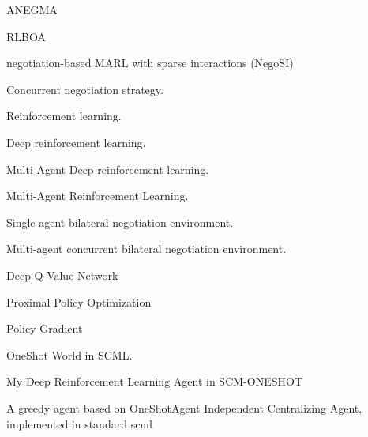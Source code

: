 %
{%
ANEGMA
}

%
{%
RLBOA
}

%
{%
negotiation-based MARL with sparse interactions (NegoSI)
}

%
{%
Concurrent negotiation strategy.
}

%
{%
Reinforcement learning.
}

%
{%
Deep reinforcement learning.
}

%
{%
Multi-Agent Deep reinforcement learning.
}

%
{%
Multi-Agent Reinforcement Learning.
}

%
{%
Single-agent bilateral negotiation environment.
}

%
{%
Multi-agent concurrent bilateral negotiation environment.
}

%
{%
Deep Q-Value Network
}

%
{%
Proximal Policy Optimization
}

%
{%
Policy Gradient
}

%
{%
OneShot World in SCML.
}

%
{%
My Deep Reinforcement Learning Agent in SCM-ONESHOT
}

%
{%
A greedy agent based on OneShotAgent
}
%
{%
Independent Centralizing Agent, implemented in standard scml
}

